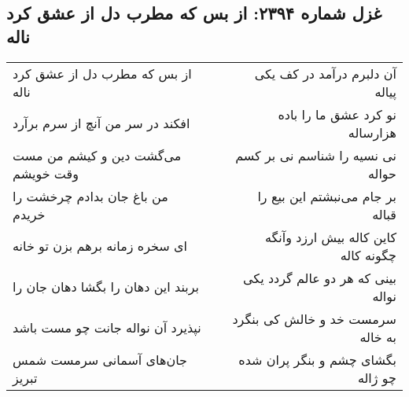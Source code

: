 \begin{center}
\section*{غزل شماره ۲۳۹۴: از بس که مطرب دل از عشق کرد ناله}
\label{sec:2394}
\begin{longtable}{l p{0.5cm} r}
از بس که مطرب دل از عشق کرد ناله
&&
آن دلبرم درآمد در کف یکی پیاله
\\
افکند در سر من آنچ از سرم برآرد
&&
نو کرد عشق ما را باده هزارساله
\\
می‌گشت دین و کیشم من مست وقت خویشم
&&
نی نسیه را شناسم نی بر کسم حواله
\\
من باغ جان بدادم چرخشت را خریدم
&&
بر جام می‌نبشتم این بیع را قباله
\\
ای سخره زمانه برهم بزن تو خانه
&&
کاین کاله بیش ارزد وآنگه چگونه کاله
\\
بربند این دهان را بگشا دهان جان را
&&
بینی که هر دو عالم گردد یکی نواله
\\
نپذیرد آن نواله جانت چو مست باشد
&&
سرمست خد و خالش کی بنگرد به خاله
\\
جان‌های آسمانی سرمست شمس تبریز
&&
بگشای چشم و بنگر پران شده چو ژاله
\\
\end{longtable}
\end{center}
